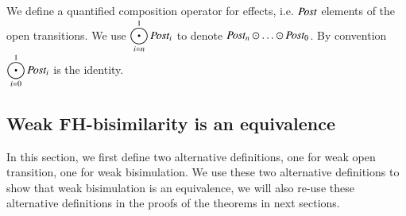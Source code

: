 \documentclass{elsarticle}
\begin{document}
We  define a quantified composition operator for effects, i.e. $\Post$ elements of the open transitions.
We use ${\displaystyle \bigodot_{i=n}^{1} \Post_i}$ to denote  $\Post_n\odot \ldots \odot \Post_0$. By convention ${\displaystyle \bigodot_{i=0}^{1} \Post_i}$ is the identity. 



\subsection{Weak FH-bisimilarity is an equivalence}\label{app-WFH-equiv}

In this section, we first define two alternative definitions, one for weak open transition, one for  weak bisimulation. We use these two alternative definitions to show that weak bisimulation is an equivalence, we will also re-use these alternative definitions in the  proofs of the theorems in next sections.
\end{document}
